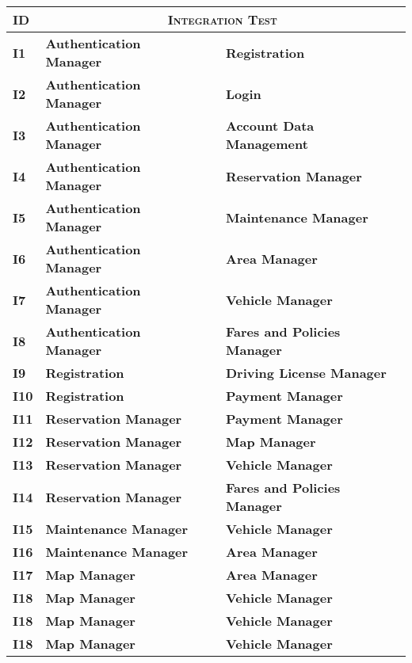\begin{longtable}{ |l|lcl| }
	\hline
	\textbf{ID} & \multicolumn{3}{c|}{\textbf{\textsc{Integration Test}}} \\
  \hline
  \textbf{I1} & \textbf{Authentication Manager} & \textbf{\textrightarrow{}} & \textbf{Registration} \\
  \hline
  \textbf{I2} & \textbf{Authentication Manager} & \textbf{\textrightarrow{}} & \textbf{Login} \\
  \hline
  \textbf{I3} & \textbf{Authentication Manager} & \textbf{\textrightarrow{}} & \textbf{Account Data Management} \\
  \hline
  \textbf{I4} & \textbf{Authentication Manager} & \textbf{\textrightarrow{}} & \textbf{Reservation Manager} \\
  \hline
  \textbf{I5} & \textbf{Authentication Manager} & \textbf{\textrightarrow{}} & \textbf{Maintenance Manager} \\
  \hline
  \textbf{I6} & \textbf{Authentication Manager} & \textbf{\textrightarrow{}} & \textbf{Area Manager} \\
  \hline
  \textbf{I7} & \textbf{Authentication Manager} & \textbf{\textrightarrow{}} & \textbf{Vehicle Manager} \\
  \hline
  \textbf{I8} & \textbf{Authentication Manager} & \textbf{\textrightarrow{}} & \textbf{Fares and Policies Manager} \\
  \hline
  \textbf{I9} & \textbf{Registration} & \textbf{\textrightarrow{}} & \textbf{Driving License Manager} \\
  \hline
  \textbf{I10} & \textbf{Registration} & \textbf{\textrightarrow{}} & \textbf{Payment Manager} \\
  \hline
  \textbf{I11} & \textbf{Reservation Manager} & \textbf{\textrightarrow{}} & \textbf{Payment Manager} \\
  \hline
  \textbf{I12} & \textbf{Reservation Manager} & \textbf{\textrightarrow{}} & \textbf{Map Manager} \\
  \hline
  \textbf{I13} & \textbf{Reservation Manager} & \textbf{\textrightarrow{}} & \textbf{Vehicle Manager} \\
  \hline
  \textbf{I14} & \textbf{Reservation Manager} & \textbf{\textrightarrow{}} & \textbf{Fares and Policies Manager} \\
  \hline
  \textbf{I15} & \textbf{Maintenance Manager} & \textbf{\textrightarrow{}} & \textbf{Vehicle Manager} \\
  \hline
  \textbf{I16} & \textbf{Maintenance Manager} & \textbf{\textrightarrow{}} & \textbf{Area Manager} \\
  \hline
  \textbf{I17} & \textbf{Map Manager} & \textbf{\textrightarrow{}} & \textbf{Area Manager} \\
  \hline
  \textbf{I18} & \textbf{Map Manager} & \textbf{\textrightarrow{}} & \textbf{Vehicle Manager} \\
  \hline
  \textbf{I18} & \textbf{Map Manager} & \textbf{\textrightarrow{}} & \textbf{Vehicle Manager} \\
  \hline
  \textbf{I18} & \textbf{Map Manager} & \textbf{\textrightarrow{}} & \textbf{Vehicle Manager} \\
  \hline
\end{longtable}


